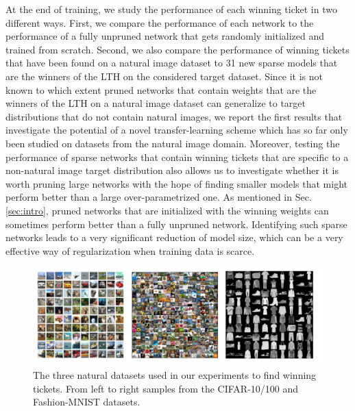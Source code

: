At the end of training, we study the performance of each winning ticket in two different ways. First, we compare the performance of each network to the performance of a fully unpruned network that gets randomly initialized and trained from scratch. Second, we also compare the performance of winning tickets that have been found on a natural image dataset to 31 new sparse models that are the winners of the LTH on the considered target dataset. Since it is not known to which extent pruned networks that contain weights that are the winners of the LTH on a natural image dataset can generalize to target distributions that do not contain natural images, we report the first results that investigate the potential of a novel transfer-learning scheme which has so far only been studied on datasets from the natural image domain. Moreover, testing the performance of sparse networks that contain winning tickets that are specific to a non-natural image target distribution also allows us to investigate whether it is worth pruning large networks with the hope of finding smaller models that might perform better than a large over-parametrized one. As mentioned in Sec. \ref{sec:intro}, pruned networks that are initialized with the winning weights can sometimes perform better than a fully unpruned network. Identifying such sparse networks leads to a very significant reduction of model size, which can be a very effective way of regularization when training data is scarce.

\begin{figure}
  \centering
   \includegraphics[width=\linewidth,height=\textheight,keepaspectratio]{./Images/Chapter05/natural_datasets.png}
   \caption{The three natural datasets used in our experiments to find winning tickets. From left to right samples from the CIFAR-10/100 and Fashion-MNIST datasets.}
\label{fig:natural_source_datasets}
\end{figure}


